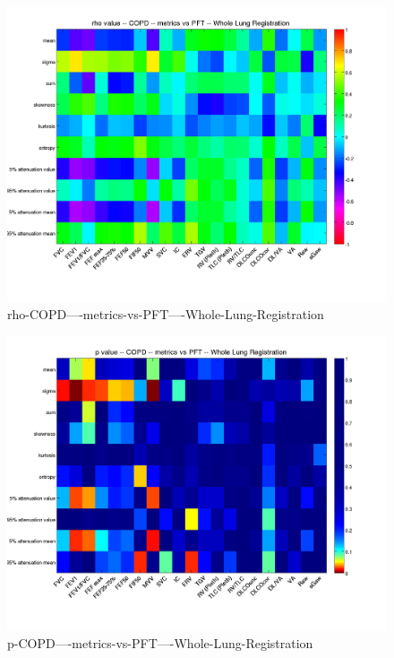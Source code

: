 \documentclass[12pt]{article}
\begin{document}
\begin{figure}
    \includegraphics[width=0.84\linewidth,viewport=100 60 620 550]{corr/rho-COPD----metrics-vs-PFT----Whole-Lung-Registration.png}
    \caption{rho-COPD----metrics-vs-PFT----Whole-Lung-Registration}
    \label{fig:rho-COPD----metrics-vs-PFT----Whole-Lung-Registration}
\end{figure}
\begin{figure}
    \includegraphics[width=0.84\linewidth,viewport=100 60 620 550]{corr/p-COPD----metrics-vs-PFT----Whole-Lung-Registration.png}
    \caption{p-COPD----metrics-vs-PFT----Whole-Lung-Registration}
    \label{fig:p-COPD----metrics-vs-PFT----Whole-Lung-Registration}
\end{figure}
\end{document}
